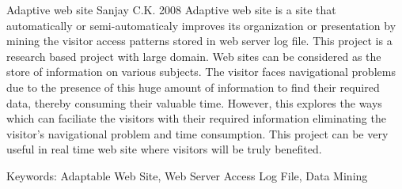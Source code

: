  \begin{conf-abstract}[]
{Adaptive web site}
{
 Sanjay C.K.
}
{2008}
Adaptive web site is a site that automatically or semi-automaticaly improves its organization or presentation by mining the visitor access patterns stored in web server log file. This project is a research based project with large domain. Web sites can be considered as the store of information on various subjects. The visitor faces navigational problems due to the presence of this huge amount of information to find their required data, thereby consuming their valuable time. However, this explores the ways which can faciliate the visitors with their required information eliminating the visitor's navigational problem and time consumption. This project can be very useful in real time web site where visitors will be truly benefited.

Keywords: Adaptable Web Site, Web Server Access Log File, Data Mining
\end{conf-abstract}